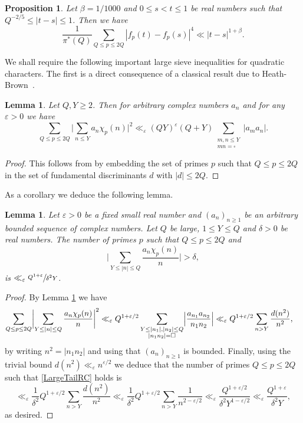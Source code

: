 \documentclass[JEP,XML,SOM,Unicode,NoFloatCountersInSection,published]{cedram}
\theoremstyle{plain}
\newtheorem{lem}[thm]{Lemma}
\newtheorem{pro}[thm]{Proposition}
\theoremstyle{definition}
\let\ep\varepsilon
\begin{document}
\begin{pro}\label{ThirdRangeTSProposition}
Let $\beta=1/1000$ and $0\leq s<t\leq 1$ be real numbers such that $Q^{-2/5}\leq |t-s|\leq 1$. Then we have
\[
\frac{1}{\pi^*(Q)}\sum_{Q\leq p\leq 2Q} |f_p(t)-f_p(s)|^{4} \ll |t-s|^{1+\beta}.
\]
\end{pro}
We shall require the following important large sieve inequalities for quadratic characters. The first is a direct consequence of a classical result due to Heath-Brown~\cite{HB}.
\begin{lem}\label{HBLargeSieve}
Let $Q, Y\geq 2$. Then for arbitrary complex numbers $a_n$
and for any $\ep>0$ we have
\[
\sum_{Q\leq p\leq 2 Q} \biggl|\sum_{n\leq Y} a_n \chi_p(n)\biggr|^2 \ll_{\ep} (QY)^{\ep}(Q+Y) \sum_{\substack{m, n \leq Y\\ mn= \square}} |a_ma_n|.
\]
\end{lem}
\begin{proof}
This follows from \cite[Cor.\,2]{HB} by embedding the set of primes $p$ such that $Q\leq p\leq 2Q$ in the set of fundamental discriminants $d$ with $|d|\leq 2Q$.
\end{proof}

As a corollary we deduce the following lemma.

\begin{lem}\label{BoundTailPolyaRC} Let $\ep>0$ be a fixed small real number and $(a_n)_{n\geq 1}$ be an arbitrary bounded sequence of complex numbers. Let $Q$ be large, $1\leq Y\leq Q$ and $\delta>0$ be real numbers. The number of primes $p$ such that $Q\leq p\leq 2Q$ and\vspace*{-3pt}
\begin{equation}\label{LargeTailRC}
\biggl|\sum_{Y\leq |n|\leq Q} \frac{a_n\chi_p(n)}{n}\biggr| >\delta,
\end{equation}
is
$\ll_{\ep} \sfrac{Q^{1+\ep}}{\delta^2 Y}$.
\end{lem}

\begin{proof}
By Lemma \ref{HBLargeSieve} we have
\begin{align*}
\sum_{Q\leq p\leq 2Q}\biggl|\sum_{Y\leq |n|\leq Q} \frac{a_n\chi_p(n) }{n}\biggr|^2 &\ll_{\ep} Q^{1+\ep/2} \sum_{\substack{Y\leq |n_1|, |n_2|\leq Q\\ |n_1n_2|=\square}} \Bigl|\frac{a_{n_1}a_{n_2}}{n_1n_2}\Bigr|
\ll_{\ep} Q^{1+\ep/2} \sum_{n>Y} \frac{d(n^2)}{n^2},
\end{align*}
by writing $n^2=|n_1n_2|$ and using that $(a_n)_{n\geq 1}$ is bounded. Finally, using the trivial bound $d(n^2)\ll_{\ep} n^{\ep/2}$ we deduce that the number of primes $Q\leq p\leq 2Q$ such that \eqref{LargeTailRC} holds is
\[
\ll_{\ep} \frac{1}{\delta^2} Q^{1+\ep/2} \sum_{n>Y} \frac{d(n^2)}{n^2}
\ll_{\ep} \frac{1}{\delta^2} Q^{1+\ep/2} \sum_{n>Y} \frac{1}{n^{2-\ep/2}} \ll_{\ep} \frac{Q^{1+\ep/2}}{\delta^2 Y^{1-\ep/2}}\ll_{\ep} \frac{Q^{1+\ep}}{\delta^2 Y},
\]
as desired.
\end{proof}
\end{document}
